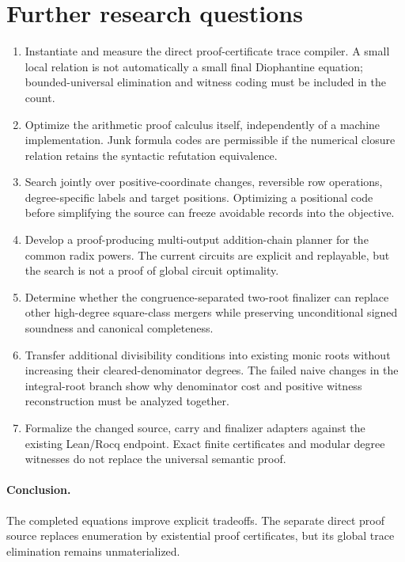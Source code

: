 \section{Further research questions}
\begin{enumerate}
\setlength{\itemsep}{0pt}\setlength{\parskip}{0pt}
\item Instantiate and measure the direct proof-certificate trace compiler. A small local relation is not automatically a small final Diophantine equation; bounded-universal elimination and witness coding must be included in the count.
\item Optimize the arithmetic proof calculus itself, independently of a machine implementation. Junk formula codes are permissible if the numerical closure relation retains the syntactic refutation equivalence.
\item Search jointly over positive-coordinate changes, reversible row operations, degree-specific labels and target positions. Optimizing a positional code before simplifying the source can freeze avoidable records into the objective.
\item Develop a proof-producing multi-output addition-chain planner for the common radix powers. The current circuits are explicit and replayable, but the search is not a proof of global circuit optimality.
\item Determine whether the congruence-separated two-root finalizer can replace other high-degree square-class mergers while preserving unconditional signed soundness and canonical completeness.
\item Transfer additional divisibility conditions into existing monic roots without increasing their cleared-denominator degrees. The failed naive changes in the integral-root branch show why denominator cost and positive witness reconstruction must be analyzed together.
\item Formalize the changed source, carry and finalizer adapters against the existing Lean/Rocq endpoint. Exact finite certificates and modular degree witnesses do not replace the universal semantic proof.
\end{enumerate}
\paragraph{Conclusion.} The completed equations improve explicit tradeoffs. The separate direct proof source replaces enumeration by existential proof certificates, but its global trace elimination remains unmaterialized.
